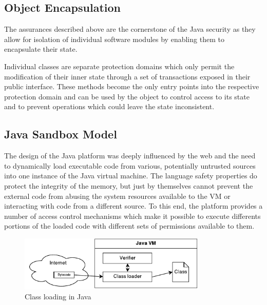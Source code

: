 \documentclass[a4paper,12pt,twoside,openright]{report}
\begin{document}
\subsection{Object Encapsulation}

The assurances described above are the cornerstone of the Java security as they allow for isolation of individual software modules by enabling them to encapsulate their state. 

Individual classes are separate protection domains which only permit the modification of their inner state through a set of transactions exposed in their public interface. These methods become the only entry points into the respective protection domain and can be used by the object to control access to its state and to prevent operations which could leave the state inconsistent.


\subsection{Java Sandbox Model}

The design of the Java platform was deeply influenced by the web and the need to dynamically load executable code from various, potentially untrusted sources into one instance of the Java virtual machine. The language safety properties do protect the integrity of the memory, but just by themselves cannot prevent the external code from abusing the system resources available to the VM or interacting with code from a different source. To this end, the platform provides a number of access control mechanisms which make it possible to execute differents portions of the loaded code with different sets of permissions available to them. 

\begin{figure}
	\centering
	\includegraphics[width=0.8\textwidth]{dia_java_classload.pdf}
	\caption{Class loading in Java}
\end{figure}
\end{document}
